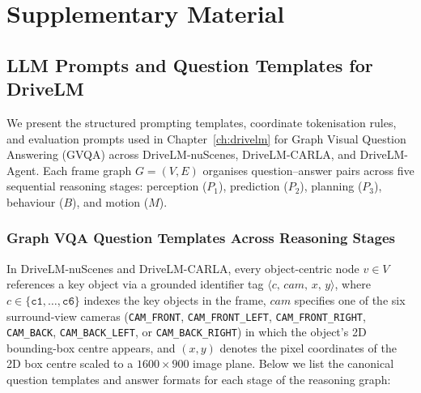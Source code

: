 \chapter{Supplementary Material}\label{app:supp}

\section{LLM Prompts and Question Templates for DriveLM}\label{app:supp:prompts}

We present the structured prompting templates, coordinate tokenisation rules, and evaluation prompts used in Chapter~\ref{ch:drivelm} for Graph Visual Question Answering (GVQA) across DriveLM-nuScenes, DriveLM-CARLA, and DriveLM-Agent. Each frame graph $G=(V,E)$ organises question--answer pairs across five sequential reasoning stages: perception ($P_1$), prediction ($P_2$), planning ($P_3$), behaviour ($B$), and motion ($M$).

\subsection{Graph VQA Question Templates Across Reasoning Stages}\label{app:supp:templates}

In DriveLM-nuScenes and DriveLM-CARLA, every object-centric node $v \in V$ references a key object via a grounded identifier tag $\langle c,\, cam,\, x,\, y\rangle$, where $c \in \{\texttt{c1},\dots,\texttt{c6}\}$ indexes the key objects in the frame, $cam$ specifies one of the six surround-view cameras (\texttt{CAM\_FRONT}, \texttt{CAM\_FRONT\_LEFT}, \texttt{CAM\_FRONT\_RIGHT}, \texttt{CAM\_BACK}, \texttt{CAM\_BACK\_LEFT}, or \texttt{CAM\_BACK\_RIGHT}) in which the object's 2D bounding-box centre appears, and $(x,y)$ denotes the pixel coordinates of the 2D box centre scaled to a $1600 \times 900$ image plane. Below we list the canonical question templates and answer formats for each stage of the reasoning graph:

